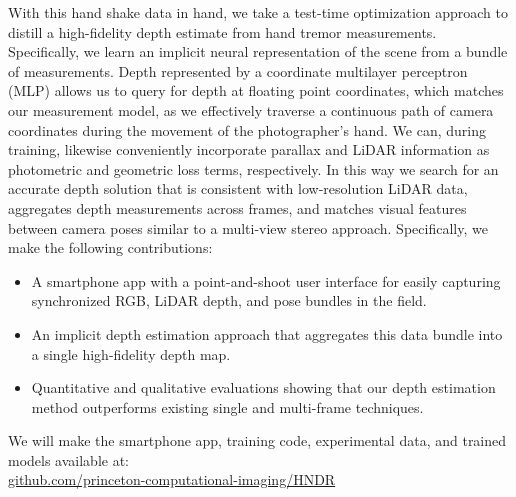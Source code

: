 With this hand shake data in hand, we take a test-time optimization approach to distill a high-fidelity depth estimate from hand tremor measurements. Specifically, we learn an implicit neural representation of the scene from a bundle of measurements. Depth represented by a coordinate multilayer perceptron (MLP) allows us to query for depth at floating point coordinates, which matches our measurement model, as we effectively traverse a continuous path of camera coordinates during the movement of the photographer's hand. We can, during training, likewise conveniently incorporate parallax and LiDAR information as photometric and geometric loss terms, respectively. In this way we search for an accurate depth solution that is consistent with low-resolution LiDAR data, aggregates depth measurements across frames, and matches visual features between camera poses similar to a multi-view stereo approach. Specifically, we make the following contributions:
\begin{itemize}
    \item A smartphone app with a point-and-shoot user interface for easily capturing synchronized RGB, LiDAR depth, and pose bundles in the field.\vspace{-0.25em}
    \item An implicit depth estimation approach that aggregates this data bundle into a single high-fidelity depth map.\vspace{-0.25em}
    \item Quantitative and qualitative evaluations showing that our depth estimation method outperforms existing single and multi-frame techniques.
\end{itemize}
%
We will make the smartphone app, training code, experimental data, and trained models available at: \\ \href{https://github.com/princeton-computational-imaging/HNDR}{github.com/princeton-computational-imaging/HNDR}